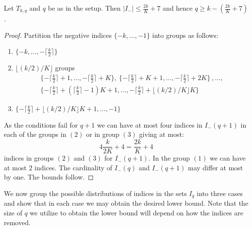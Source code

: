 \documentclass{toc}
\begin{document}
\begin{lemma}\label{lem:belowsmall} Let $T_{k,q}$ and $q$ be as in the setup.
Then  $|I_-|\leq \frac{2k}{K}+7$ and hence
$q\geq k-(\frac{2k}{K}+7)$.
\end{lemma}
\begin{proof}
Partition  the negative indices $\{-k,\ldots, -1\}$  into groups  as follows:
\begin{enumerate}
\item $\{-k,\ldots, -\lceil \frac k2\rceil\}$
\item $\lfloor (k/2)/K\rfloor$ groups 
\begin{align*}\{-\lceil \frac k2\rceil+1,\ldots, -\lceil \frac k2\rceil+K\},\ 
 \{-\lceil \frac k2\rceil+K+1,\ldots, -\lceil \frac k2\rceil+2K\} \ 
 ,\ldots, \\ 
 \{-\lceil \frac k2\rceil+(\lceil \frac k2\rceil -1)K+1,\ldots, -\lceil \frac k2\rceil+ \lfloor (k/2)/K\rfloor K\}
 \end{align*}
\item $\{-\lceil \frac k2\rceil+ \lfloor (k/2)/K\rfloor K+1,\ldots, -1\}$
\end{enumerate}
 As the conditions fail for $q+1$ we can have at most four indices in $I_-(q+1)$ in each of the groups in $(2)$ or in group $(3)$ giving at most:
\[4\frac{k}{2K}+4=\frac{2k}{K}+4\]
indices in groups $(2)$ and $(3)$ for $I_-(q+1)$. In the group $(1)$ we can have at most $2$ indices. 
The cardinality of $I_-(q)$ and $I_-(q+1)$ may differ at most by one. The bounds follow.
\end{proof}
We now group the possible distributions of indices in the %
sets $I_q$  %
into three
cases and show that in each case we may obtain the desired lower bound.
Note that the size of $q$ we utilize to obtain the lower bound will depend on
  how the indices are removed.
 
\end{document}
